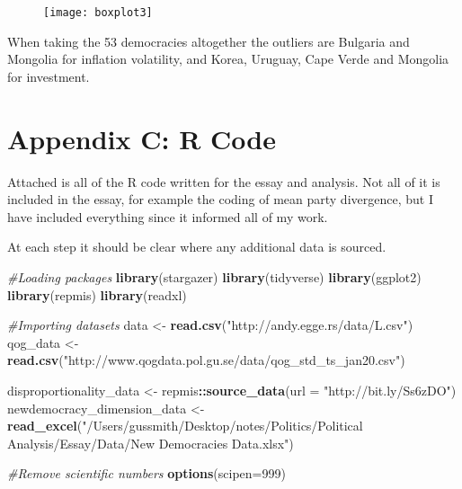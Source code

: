 \documentclass[11pt, oneside]{article}   	%
\newenvironment{Shaded}{\begin{snugshade}}{\end{snugshade}}
\newcommand{\CommentTok}[1]{\textcolor[rgb]{0.56,0.35,0.01}{\textit{#1}}}
\newcommand{\DataTypeTok}[1]{\textcolor[rgb]{0.13,0.29,0.53}{#1}}
\newcommand{\DecValTok}[1]{\textcolor[rgb]{0.00,0.00,0.81}{#1}}
\newcommand{\KeywordTok}[1]{\textcolor[rgb]{0.13,0.29,0.53}{\textbf{#1}}}
\newcommand{\NormalTok}[1]{#1}
\newcommand{\OperatorTok}[1]{\textcolor[rgb]{0.81,0.36,0.00}{\textbf{#1}}}
\newcommand{\StringTok}[1]{\textcolor[rgb]{0.31,0.60,0.02}{#1}}
\begin{document}
 \begin{figure}[h]
 \texttt{[image: boxplot3]}
 \end{figure}
 
 \begin{flushleft}
 When taking the 53 democracies altogether the outliers are Bulgaria and Mongolia for inflation volatility, and Korea, Uruguay, Cape Verde and Mongolia for investment.
 \end{flushleft}





\newpage

\hypertarget{appendix-c-r-code}{%
\section*{Appendix C: R Code}\label{appendix-c-r-code}}

Attached is all of the R code written for the essay and analysis. Not
all of it is included in the essay, for example the coding of mean party
divergence, but I have included everything since it informed all of my
work.

At each step it should be clear where any additional data is sourced.

\begin{Shaded}
\begin{Highlighting}[]
\CommentTok{#Loading packages}
\KeywordTok{library}\NormalTok{(stargazer)}
\KeywordTok{library}\NormalTok{(tidyverse)}
\KeywordTok{library}\NormalTok{(ggplot2)}
\KeywordTok{library}\NormalTok{(repmis)}
\KeywordTok{library}\NormalTok{(readxl)}

\CommentTok{#Importing datasets}
\NormalTok{data <-}\StringTok{ }\KeywordTok{read.csv}\NormalTok{(}\StringTok{"http://andy.egge.rs/data/L.csv"}\NormalTok{)}
\NormalTok{qog_data <-}\StringTok{ }\KeywordTok{read.csv}\NormalTok{(}\StringTok{"http://www.qogdata.pol.gu.se/data/qog_std_ts_jan20.csv"}\NormalTok{)}
\end{Highlighting}
\end{Shaded}

\begin{Shaded}
\begin{Highlighting}[]
\NormalTok{disproportionality_data <-}\StringTok{ }\NormalTok{repmis}\OperatorTok{::}\KeywordTok{source_data}\NormalTok{(}\DataTypeTok{url =} \StringTok{"http://bit.ly/Ss6zDO"}\NormalTok{)}
\NormalTok{newdemocracy_dimension_data <-}\StringTok{ }\KeywordTok{read_excel}\NormalTok{(}\StringTok{"/Users/gussmith/Desktop/notes/Politics/Political Analysis/Essay/Data/New Democracies Data.xlsx"}\NormalTok{)}

\CommentTok{#Remove scientific numbers}
\KeywordTok{options}\NormalTok{(}\DataTypeTok{scipen=}\DecValTok{999}\NormalTok{)}
\end{Highlighting}
\end{Shaded}
\end{document}
